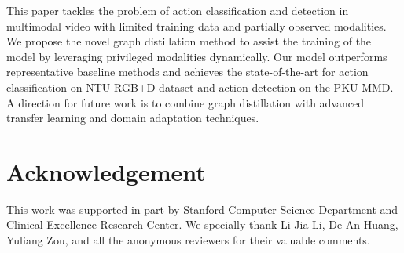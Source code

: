 This paper tackles the problem of action classification and detection in multimodal video with limited training data and partially observed modalities. We propose the novel graph distillation method to assist the training of the model by leveraging privileged modalities dynamically. Our model outperforms representative baseline methods and achieves the state-of-the-art for action classification on NTU RGB+D dataset and action detection on the PKU-MMD. A direction for future work is to combine graph distillation with advanced transfer learning and domain adaptation techniques.

\section{Acknowledgement} 
This work was supported in part by Stanford Computer Science Department and Clinical Excellence Research Center. We specially thank Li-Jia Li, De-An Huang, Yuliang Zou, and all the anonymous reviewers for their valuable comments.
